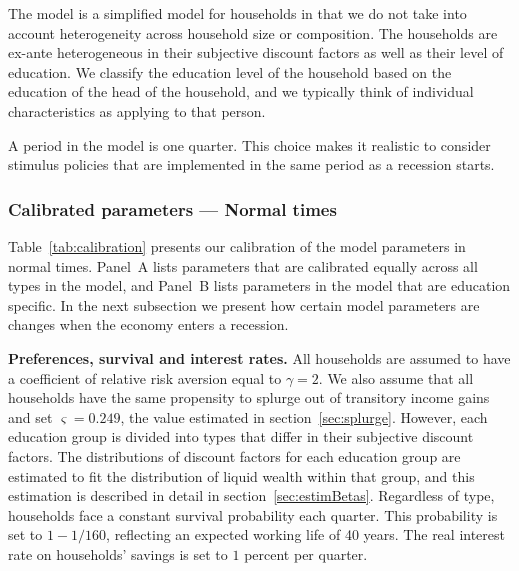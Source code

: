 \documentclass[\econtexRoot/HAFiscal]{subfiles}
\begin{document}
The model is a simplified model for households in that we do not take into account heterogeneity across household size or composition.
The households are ex-ante heterogeneous in their subjective discount factors as well as their level of education.
We classify the education level of the household based on the education of the head of the household, and we typically think of individual characteristics as applying to that person.


A period in the model is one quarter.
This choice makes it realistic to consider stimulus policies that are implemented in the same period as a recession starts.


\subsubsection{Calibrated parameters --- Normal times} 
\notinsubfile{\label{sec:calib}}

Table~\ref{tab:calibration} presents our calibration of the model parameters in normal times.
Panel~A lists parameters that are calibrated equally across all types in the model, and Panel~B lists parameters in the model that are education specific.
In the next subsection we present how certain model parameters are changes when the economy enters a recession.


\textbf{Preferences, survival and interest rates.} All households are assumed to have a coefficient of relative risk aversion equal to $\gamma=2$.
We also assume that all households have the same propensity to splurge out of transitory income gains and set $\varsigma=0.249$, the value estimated in section~\ref{sec:splurge}.
However, each education group is divided into types that differ in their subjective discount factors.
The distributions of discount factors for each education group are estimated to fit the distribution of liquid wealth within that group, and this estimation is described in detail in section~\ref{sec:estimBetas}.
Regardless of type, households face a constant survival probability each quarter.
This probability is set to $1-1/160$, reflecting an expected working life of 40 years.
The real interest rate on households' savings is set to $1$ percent per quarter.
\end{document}

